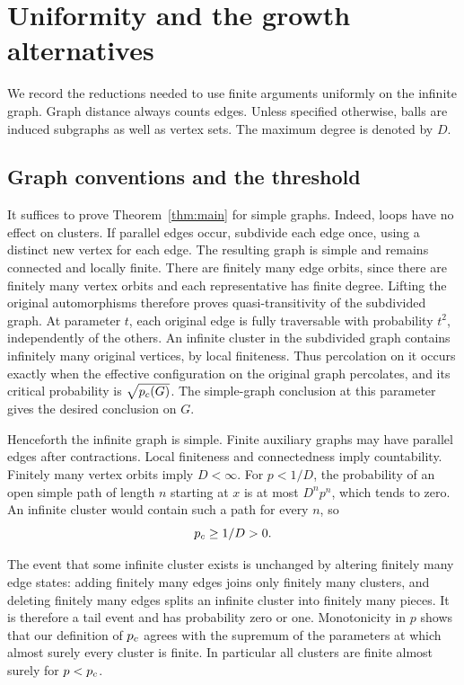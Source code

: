 \section{Uniformity and the growth alternatives}
\label{sec:preliminaries}

We record the reductions needed to use finite arguments uniformly on
the infinite graph. Graph distance always counts edges. Unless
specified otherwise, balls are induced subgraphs as well as vertex
sets. The maximum degree is denoted by $D$.

\subsection{Graph conventions and the threshold}

It suffices to prove Theorem~\ref{thm:main} for simple graphs.
Indeed, loops have no effect on clusters. If parallel edges occur,
subdivide each edge once, using a distinct new vertex for each edge.
The resulting graph is simple and remains connected and locally
finite. There are finitely many edge orbits, since there are finitely
many vertex orbits and each representative has finite degree.
Lifting the original automorphisms therefore proves quasi-transitivity
of the subdivided graph. At parameter $t$, each original edge is
fully traversable with probability $t^2$, independently of the others.
An infinite cluster in the subdivided graph contains infinitely many
original vertices, by local finiteness. Thus percolation on it occurs
exactly when the effective configuration on the original graph
percolates, and its critical probability is $\sqrt{p_c(G)}$.
The simple-graph conclusion at this parameter gives the desired
conclusion on $G$.

Henceforth the infinite graph is simple. Finite auxiliary graphs may
have parallel edges after contractions. Local finiteness and
connectedness imply countability. Finitely many vertex orbits imply $D<\infty$.
For $p<1/D$, the probability of an open simple path of length $n$
starting at $x$ is at most $D^np^n$, which tends to zero. An infinite
cluster would contain such a path for every $n$, so
\begin{equation}
\label{eq:positive-threshold}
 p_c\ge 1/D>0.
\end{equation}

The event that some infinite cluster exists is unchanged by altering
finitely many edge states: adding finitely many edges joins only
finitely many clusters, and deleting finitely many edges splits an
infinite cluster into finitely many pieces. It is therefore a tail
event and has probability zero or one. Monotonicity in $p$ shows that
our definition of $p_c$ agrees with the supremum of the parameters
at which almost surely every cluster is finite. In particular all
clusters are finite almost surely for $p<p_c$.

